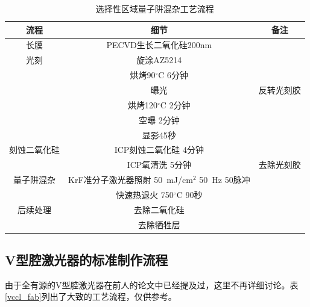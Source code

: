 \documentclass{ZJUthesis}
\begin{document}
\begin{table}[htbp]
    \caption{选择性区域量子阱混杂工艺流程}
    \centering
    \label{qwi_regions}
    \begin{tabular}{ccc}
        \hline
        \hline
        流程 & 细节 & 备注\\
        \hline
        长膜 &PECVD生长二氧化硅200nm &\\
        \hline
        光刻 &旋涂AZ5214 &\\
            &烘烤90$^{\circ}$C 6分钟 &\\
            &曝光 & 反转光刻胶\\
            &烘烤120$^{\circ}$C 2分钟 &\\
            &空曝 2分钟 &\\
            &显影45秒 &\\
        \hline
        刻蚀二氧化硅 &ICP刻蚀二氧化硅 4分钟 &\\
            &ICP氧清洗 5分钟 & 去除光刻胶\\
        \hline
        量子阱混杂 &KrF准分子激光器照射 50~mJ/cm$^2$ 50~Hz 50脉冲 &\\
            &快速热退火 750$^{\circ}$C 90秒 &\\
        \hline
        后续处理 &去除二氧化硅 &\\
            &去除牺牲层 &\\
        \hline
        \hline
    \end{tabular}
\end{table}

\subsection{V型腔激光器的标准制作流程}

由于全有源的V型腔激光器在前人的论文中已经提及过\cite{金嘉亮2012基}，这里不再详细讨论。表\ref{vccl_fab}列出了大致的工艺流程，仅供参考。
\end{document}

